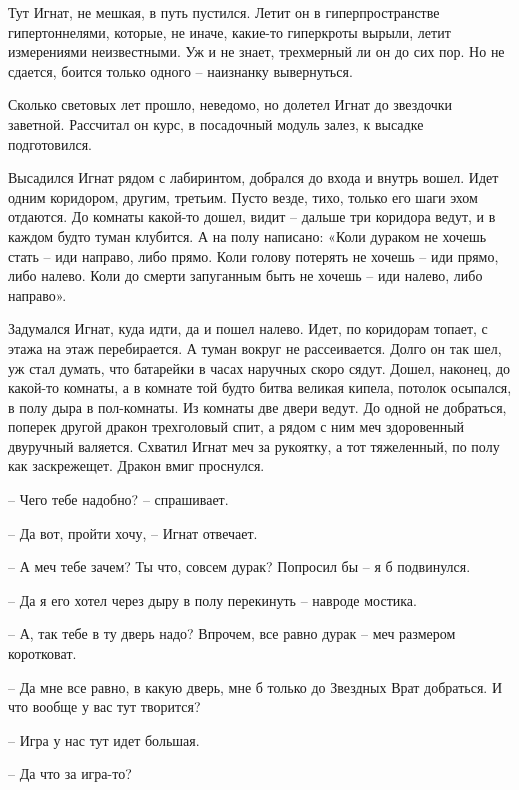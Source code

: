 \documentclass[ebook,oneside,final,openright]{memoir}
\begin{document}
\par
Тут Игнат, не мешкая, в путь пустился. Летит он в гиперпространстве гипертоннелями, которые, не иначе, какие-то гиперкроты вырыли, летит измерениями неизвестными. Уж и не знает, трехмерный ли он до сих пор. Но не сдается, боится только одного – наизнанку вывернуться.\par
\par
Сколько световых лет прошло, неведомо, но долетел Игнат до звездочки заветной. Рассчитал он курс, в посадочный модуль залез, к высадке подготовился.\par
\par
Высадился Игнат рядом с лабиринтом, добрался до входа и внутрь вошел. Идет одним коридором, другим, третьим. Пусто везде, тихо, только его шаги эхом отдаются. До комнаты какой-то дошел, видит – дальше три коридора ведут, и в каждом будто туман клубится. А на полу написано: «Коли дураком не хочешь стать – иди направо, либо прямо. Коли голову потерять не хочешь – иди прямо, либо налево. Коли до смерти запуганным быть не хочешь – иди налево, либо направо».\par
\par
Задумался Игнат, куда идти, да и пошел налево. Идет, по коридорам топает, с этажа на этаж перебирается. А туман вокруг не рассеивается. Долго он так шел, уж стал думать, что батарейки в часах наручных скоро сядут. Дошел, наконец, до какой-то комнаты, а в комнате той будто битва великая кипела, потолок осыпался, в полу дыра в пол-комнаты. Из комнаты две двери ведут. До одной не добраться, поперек другой дракон трехголовый спит, а рядом с ним меч здоровенный двуручный валяется. Схватил Игнат меч за рукоятку, а тот тяжеленный, по полу как заскрежещет. Дракон вмиг проснулся.\par
\par
– Чего тебе надобно? – спрашивает.\par
– Да вот, пройти хочу, – Игнат отвечает.\par
– А меч тебе зачем? Ты что, совсем дурак? Попросил бы – я б подвинулся.\par
– Да я его хотел через дыру в полу перекинуть – навроде мостика.\par
– А, так тебе в ту дверь надо? Впрочем, все равно дурак – меч размером коротковат.\par
– Да мне все равно, в какую дверь, мне б только до Звездных Врат добраться. И что вообще у вас тут творится?\par
– Игра у нас тут идет большая.\par
– Да что за игра-то?\par
\end{document}
